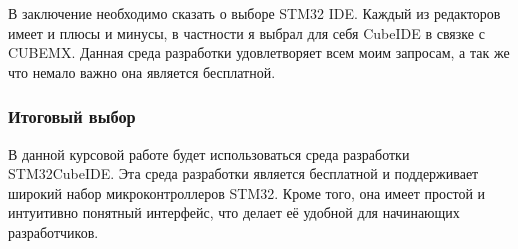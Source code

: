 В заключение необходимо сказать о выборе STM32 IDE. Каждый из редакторов имеет и плюсы и минусы, в частности я выбрал для себя CubeIDE в связке с CUBEMX. Данная среда разработки удовлетворяет всем моим запросам, а так же что немало важно она является бесплатной.

\subsubsection{Итоговый выбор}

В данной курсовой работе будет использоваться среда разработки STM32CubeIDE. Эта среда разработки является бесплатной и поддерживает широкий набор микроконтроллеров STM32. Кроме того, она имеет простой и интуитивно понятный интерфейс, что делает её удобной для начинающих разработчиков.